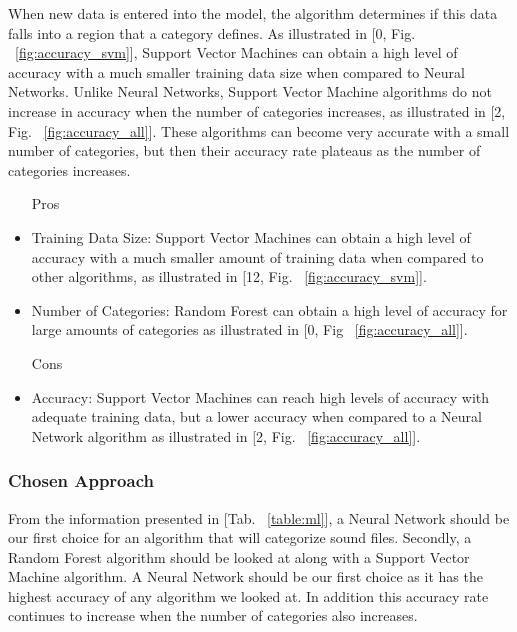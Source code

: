\documentclass[12pt,journal,compsoc]{IEEEtran}
\newenvironment{subs}
  {\adjustwidth{1em}{0pt}}
  {\endadjustwidth}
\begin{document}
\begin{subs}
\begin{subs}
\begin{subs}
\skippingparagraph 
When new data is entered into the model, the algorithm determines if this data falls into a region that a category defines. As illustrated in [0, Fig. ~\ref{fig:accuracy_svm}], Support Vector Machines can obtain a high level of accuracy with a much smaller training data size when compared to Neural Networks. Unlike Neural Networks, Support Vector Machine algorithms do not increase in accuracy when the number of categories increases, as illustrated in [2, Fig. ~\ref{fig:accuracy_all}]. These algorithms can become very accurate with a small number of categories, but then their accuracy rate plateaus as the number of categories increases.

\begin{subs}
\begin{itemize}
    \item [{Pros}]
    \item Training Data Size: Support Vector Machines can obtain a high level of accuracy with a much smaller amount of training data when compared to other algorithms, as illustrated in [12, Fig. ~\ref{fig:accuracy_svm}].
    \item Number of Categories: Random Forest can obtain a high level of accuracy for large amounts of categories as illustrated in [0, Fig ~\ref{fig:accuracy_all}].
    \item [{Cons}]
    \item Accuracy: Support Vector Machines can reach high levels of accuracy with adequate training data, but a lower accuracy when compared to a Neural Network algorithm as illustrated in [2, Fig. ~\ref{fig:accuracy_all}].
\end{itemize}
\end{subs}
\end{subs}

\subsubsection{Chosen Approach}
From the information presented in [Tab. ~\ref{table:ml}], a Neural Network should be our first choice for an algorithm that will categorize sound files. Secondly, a Random Forest algorithm should be looked at along with a Support Vector Machine algorithm. A Neural Network should be our first choice as it has the highest accuracy of any algorithm we looked at. In addition this accuracy rate continues to increase when the number of categories also increases.


\end{subs}
\end{subs}
\end{document}
